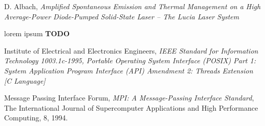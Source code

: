 \begin{thebibliography}{9}


    D. Albach,
    \emph{Amplified Spontaneous Emission and Thermal Management on a High Average-Power Diode-Pumped Solid-State Laser \--- The Lucia Laser System}

    lorem ipsum
    \textbf{TODO}

    Institute of Electrical and Electronics Engineers,
    \emph{IEEE Standard for Information Technology 1003.1c-1995,
    Portable Operating System Interface (POSIX) Part 1: System Application Program Interface (API) Amendment 2: Threads Extension [C Language]}

    Message Passing Interface Forum,
    \emph{MPI: A Message-Passing Interface Standard}, 
    The International Journal of Supercomputer Applications and High Performance Computing, 8, 1994.

\end{thebibliography}
